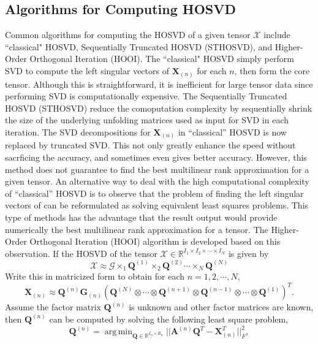 \documentclass[preprint]{elsarticle}
\DeclareMathOperator*{\argmin}{arg\,min}
\begin{document}
\subsection*{Algorithms for Computing HOSVD}
\noindent Common algorithms for computing the HOSVD of a given tensor $\boldsymbol{\mathscr{X}}$ include ``classical" HOSVD, Sequentially Truncated HOSVD (STHOSVD), and
Higher-Order Orthogonal Iteration (HOOI).
\vskip 0.3cm
\noindent The ``classical" HOSVD simply perform SVD to compute the left singular vectors of $\mathbf{X}_{(n)}$ for each $n$,
then form the core tensor. Although this is straightforward, it is inefficient for large tensor data since performing SVD
is computationally expensive.
\vskip 0.3cm
\noindent The Sequentially Truncated HOSVD (STHOSVD) reduce the comoputation complexity by sequentially shrink the size of
the underlying unfolding matrices used as input for SVD in each iteration. The SVD decompositions for $\mathbf{X}_{(n)}$ in ``classical'' HOSVD
is now replaced by truncated SVD. This not only greatly enhance the speed without sacrficing the accuracy, and sometimes even
gives better accuracy. However, this method does not guarantee to find the best multilinear rank approximation for a given tensor.
\vskip 0.3cm
\noindent An alternative way to deal with the high computational complexity of ``classical'' HOSVD is to observe that the problem
of finding the left singular vectors of can be reformulated as solving equivalent least squares problems. This type of methods has the advantage that
the result output would provide numerically the best multilinear rank approximation for a tensor.
The Higher-Order Orthogonal Iteration (HOOI) algorithm is developed based on this observation. If the HOSVD of the tensor
$\boldsymbol{\mathscr{X}}\in\mathbb{R}^{I_1\times I_2\times\cdots\times I_N}$ is given by
\[
    \boldsymbol{\mathscr{X}}\approx \boldsymbol{\mathscr{G}}\times_1\mathbf{Q}^{(1)}\times_2\mathbf{Q}^{(2)}\cdots\times_N\mathbf{Q}^{(N)}  
\]
Write this in matricized form to obtain for each $n=1,2,\cdots,N$,
\[
    \mathbf{X}_{(n)}\approx \mathbf{Q}^{(n)}\mathbf{G}_{(n)}\left(\mathbf{Q}^{(N)}\otimes\cdots\otimes\mathbf{Q}^{(n+1)}
    \otimes\mathbf{Q}^{(n-1)}\otimes\cdots\otimes\mathbf{Q}^{(1)}\right)^T.
\]
Assume the factor matrix $\mathbf{Q}^{(n)}$ is unknown and other factor matrices are known, then $\mathbf{Q}^{(n)}$
can be computed by solving the following least square problem,
\begin{equation}
    \mathbf{Q}^{(n)} = \argmin_{\mathbf{Q}\in\mathbb{R}^{I_n\times R_n}}||\mathbf{A}^{(n)}\mathbf{Q}^T-\mathbf{X}_{(n)}^T||_F^2,
\end{equation}
\end{document}
